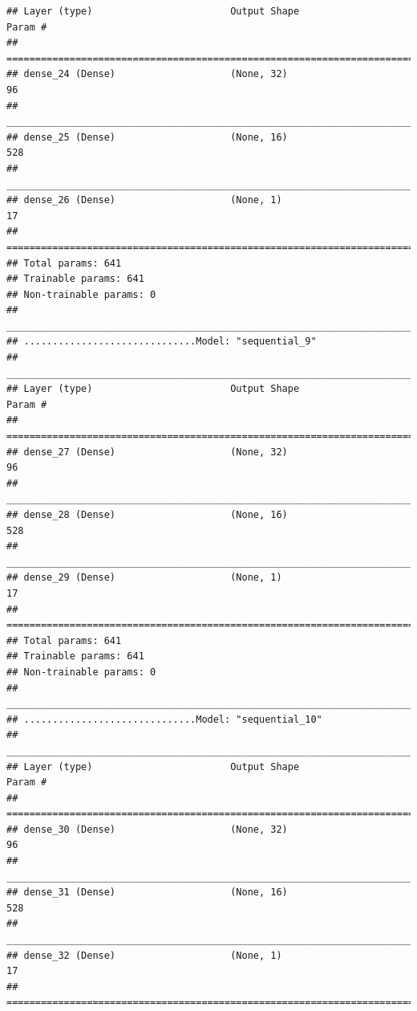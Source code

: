 \documentclass[
]{article}
\begin{document}
\begin{verbatim}
## Layer (type)                        Output Shape                    Param #     
## ================================================================================
## dense_24 (Dense)                    (None, 32)                      96          
## ________________________________________________________________________________
## dense_25 (Dense)                    (None, 16)                      528         
## ________________________________________________________________________________
## dense_26 (Dense)                    (None, 1)                       17          
## ================================================================================
## Total params: 641
## Trainable params: 641
## Non-trainable params: 0
## ________________________________________________________________________________
## ..............................Model: "sequential_9"
## ________________________________________________________________________________
## Layer (type)                        Output Shape                    Param #     
## ================================================================================
## dense_27 (Dense)                    (None, 32)                      96          
## ________________________________________________________________________________
## dense_28 (Dense)                    (None, 16)                      528         
## ________________________________________________________________________________
## dense_29 (Dense)                    (None, 1)                       17          
## ================================================================================
## Total params: 641
## Trainable params: 641
## Non-trainable params: 0
## ________________________________________________________________________________
## ..............................Model: "sequential_10"
## ________________________________________________________________________________
## Layer (type)                        Output Shape                    Param #     
## ================================================================================
## dense_30 (Dense)                    (None, 32)                      96          
## ________________________________________________________________________________
## dense_31 (Dense)                    (None, 16)                      528         
## ________________________________________________________________________________
## dense_32 (Dense)                    (None, 1)                       17          
## ================================================================================

\end{verbatim}
\end{document}

